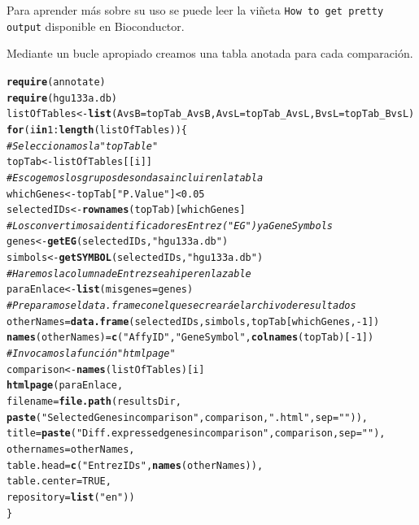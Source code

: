 \documentclass[a4paper]{article}\usepackage[]{graphicx}\usepackage[]{color}
\makeatletter
\newcommand{\hlnum}[1]{\textcolor[rgb]{0.686,0.059,0.569}{#1}}%
\newcommand{\hlstr}[1]{\textcolor[rgb]{0.192,0.494,0.8}{#1}}%
\newcommand{\hlcom}[1]{\textcolor[rgb]{0.678,0.584,0.686}{\textit{#1}}}%
\newcommand{\hlopt}[1]{\textcolor[rgb]{0,0,0}{#1}}%
\newcommand{\hlstd}[1]{\textcolor[rgb]{0.345,0.345,0.345}{#1}}%
\newcommand{\hlkwa}[1]{\textcolor[rgb]{0.161,0.373,0.58}{\textbf{#1}}}%
\newcommand{\hlkwb}[1]{\textcolor[rgb]{0.69,0.353,0.396}{#1}}%
\newcommand{\hlkwc}[1]{\textcolor[rgb]{0.333,0.667,0.333}{#1}}%
\newcommand{\hlkwd}[1]{\textcolor[rgb]{0.737,0.353,0.396}{\textbf{#1}}}%
\newenvironment{kframe}{%
 \def\at@end@of@kframe{}%
 \ifinner\ifhmode%
  \def\at@end@of@kframe{\end{minipage}}%
  \begin{minipage}{\columnwidth}%
 \fi\fi%
 \def\FrameCommand##1{\hskip\@totalleftmargin \hskip-\fboxsep
 \colorbox{shadecolor}{##1}\hskip-\fboxsep
     \hskip-\linewidth \hskip-\@totalleftmargin \hskip\columnwidth}%
 \MakeFramed {\advance\hsize-\width
   \@totalleftmargin\z@ \linewidth\hsize
   \@setminipage}}%
 {\par\unskip\endMakeFramed%
 \at@end@of@kframe}
\newenvironment{knitrout}{}{} %
\makeatother
\begin{document}
Para aprender más sobre su uso se puede leer la viñeta \texttt{How to get pretty output} disponible en Bioconductor.

Mediante un bucle apropiado creamos una tabla anotada para cada comparaci\'on.

\begin{knitrout}
\color{fgcolor}\begin{kframe}
\begin{alltt}
\hlkwd{require}\hlstd{(annotate)}
\hlkwd{require}\hlstd{(hgu133a.db)}
\hlstd{listOfTables} \hlkwb{<-} \hlkwd{list}\hlstd{(}\hlkwc{AvsB} \hlstd{= topTab_AvsB,} \hlkwc{AvsL} \hlstd{= topTab_AvsL,} \hlkwc{BvsL} \hlstd{= topTab_BvsL)}
\hlkwa{for} \hlstd{(i} \hlkwa{in} \hlnum{1}\hlopt{:}\hlkwd{length}\hlstd{(listOfTables))\{}
  \hlcom{# Seleccionamos la "topTable"}
  \hlstd{topTab} \hlkwb{<-} \hlstd{listOfTables[[i]]}
  \hlcom{# Escogemos los grupos de sondas a incluir en la tabla}
  \hlstd{whichGenes}\hlkwb{<-}\hlstd{topTab[}\hlstr{"P.Value"}\hlstd{]}\hlopt{<}\hlnum{0.05}
  \hlstd{selectedIDs} \hlkwb{<-} \hlkwd{rownames}\hlstd{(topTab)[whichGenes]}
  \hlcom{# Los convertimos a identificadores Entrez ("EG") y a Gene Symbols}
  \hlstd{genes}\hlkwb{<-} \hlkwd{getEG}\hlstd{(selectedIDs,} \hlstr{"hgu133a.db"}\hlstd{)}
  \hlstd{simbols} \hlkwb{<-}\hlkwd{getSYMBOL}\hlstd{(selectedIDs,} \hlstr{"hgu133a.db"}\hlstd{)}
  \hlcom{# Haremos la columna de Entrez sea hiperenlazable}
  \hlstd{paraEnlace} \hlkwb{<-} \hlkwd{list} \hlstd{(}\hlkwc{misgenes}\hlstd{=genes)}
  \hlcom{# Preparamos el data.frame con el que se creará el archivo de resultados}
  \hlstd{otherNames} \hlkwb{=} \hlkwd{data.frame}\hlstd{(selectedIDs, simbols, topTab[whichGenes,}\hlopt{-}\hlnum{1}\hlstd{])}
  \hlkwd{names}\hlstd{(otherNames)} \hlkwb{=} \hlkwd{c}\hlstd{(}\hlstr{"Affy ID"}\hlstd{,} \hlstr{"Gene Symbol"}\hlstd{,} \hlkwd{colnames}\hlstd{(topTab)[}\hlopt{-}\hlnum{1}\hlstd{])}
  \hlcom{# Invocamos la función "htmlpage"}
  \hlstd{comparison} \hlkwb{<-} \hlkwd{names}\hlstd{(listOfTables)[i]}
  \hlkwd{htmlpage}\hlstd{(paraEnlace,}
           \hlkwc{filename} \hlstd{=}\hlkwd{file.path}\hlstd{(resultsDir,}
           \hlkwd{paste}\hlstd{(}\hlstr{"Selected Genes in comparison "}\hlstd{,comparison,}\hlstr{".html"}\hlstd{,} \hlkwc{sep}\hlstd{=}\hlstr{""}\hlstd{)) ,}
           \hlkwc{title} \hlstd{=} \hlkwd{paste}\hlstd{(}\hlstr{"Diff. expressed genes in comparison "}\hlstd{, comparison,} \hlkwc{sep}\hlstd{=}\hlstr{""}\hlstd{),}
           \hlkwc{othernames} \hlstd{= otherNames,}
           \hlkwc{table.head} \hlstd{=} \hlkwd{c}\hlstd{(}\hlstr{"Entrez IDs"}\hlstd{,} \hlkwd{names}\hlstd{(otherNames)),}
           \hlkwc{table.center} \hlstd{=} \hlnum{TRUE}\hlstd{,}
           \hlkwc{repository}\hlstd{=}\hlkwd{list}\hlstd{(}\hlstr{"en"}\hlstd{))}
\hlstd{\}}
\end{alltt}
\end{kframe}
\end{knitrout}
\end{document}
